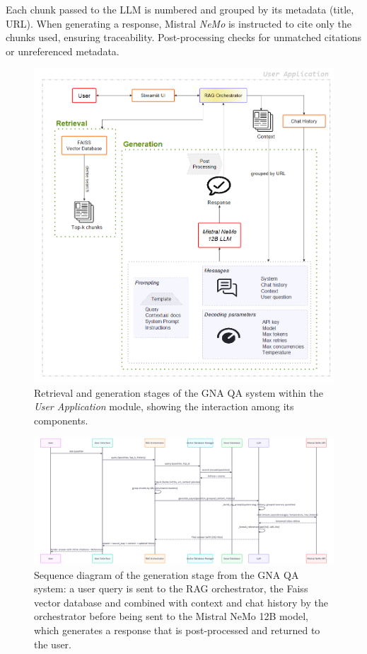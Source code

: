 \begin{spacing}{1.5}
Each chunk passed to the LLM is numbered and grouped by its metadata (title, URL). When generating a response, Mistral \textit{NeMo} is instructed to cite only the chunks used, ensuring traceability. Post-processing checks for unmatched citations or unreferenced metadata.


\begin{figure}[H]
  \centering
  \includegraphics[width=\textwidth]{images/generation_diagram.png} 
  \caption{Retrieval and generation stages of the GNA QA system within the \textit{User Application} module, showing the interaction among its components.}
  \label{fig:generation_diagram}
\end{figure}

\begin{figure}[H]
  \centering
  \includegraphics[width=\textwidth]{images/generation_workflow.png} 
  \caption{Sequence diagram of the generation stage from the GNA QA system: a user query is sent to the RAG orchestrator, the Faiss vector database and combined with context and chat history by the orchestrator before being sent to the Mistral NeMo 12B model, which generates a response that is post-processed and returned to the user.}
  \label{fig:generation_workflow}
\end{figure}



\end{spacing}
